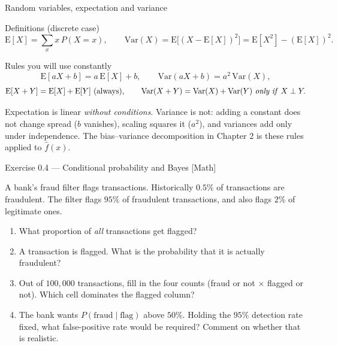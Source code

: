 \documentclass[aspectratio=169,11pt]{beamer}
\begin{document}
\begin{frame}{Random variables, expectation and variance}
  \begin{block}{Definitions (discrete case)}
    \[
      \mathrm{E}[X] = \sum_x x\,P(X=x),
      \qquad
      \mathrm{Var}(X) = \mathrm{E}\bigl[(X - \mathrm{E}[X])^2\bigr]
                      = \mathrm{E}[X^2] - (\mathrm{E}[X])^2 .
    \]
  \end{block}
  \begin{block}{Rules you will use constantly}
    \footnotesize
    \[
      \mathrm{E}[aX + b] = a\,\mathrm{E}[X] + b,
      \qquad
      \mathrm{Var}(aX + b) = a^2\,\mathrm{Var}(X),
    \]
    \[
      \mathrm{E}[X + Y] = \mathrm{E}[X] + \mathrm{E}[Y] \ \text{(always)},
      \qquad
      \mathrm{Var}(X + Y) = \mathrm{Var}(X) + \mathrm{Var}(Y)
      \ \text{\emph{only if} } X \perp Y .
    \]
  \end{block}
  \begin{takeaway}
    Expectation is linear \emph{without conditions}. Variance is not:
    adding a constant does not change spread ($b$ vanishes), scaling squares
    it ($a^2$), and variances add only under independence. The
    bias--variance decomposition in Chapter 2 is these rules applied to
    $\hat f(x)$.
  \end{takeaway}
\end{frame}

\begin{frame}{Exercise 0.4 --- Conditional probability and Bayes [Math]}
  \begin{exercise}
    A bank's fraud filter flags transactions. Historically $0.5\%$ of
    transactions are fraudulent. The filter flags $95\%$ of fraudulent
    transactions, and also flags $2\%$ of legitimate ones.
    \begin{enumerate}
      \item What proportion of \emph{all} transactions get flagged?
      \item A transaction is flagged. What is the probability that it is
            actually fraudulent?
      \item Out of $100{,}000$ transactions, fill in the four counts (fraud
            or not $\times$ flagged or not). Which cell dominates the flagged
            column?
      \item The bank wants $P(\text{fraud} \mid \text{flag})$ above $50\%$.
            Holding the $95\%$ detection rate fixed, what false-positive rate
            would be required? Comment on whether that is realistic.
    \end{enumerate}
  \end{exercise}
\end{frame}
\end{document}
